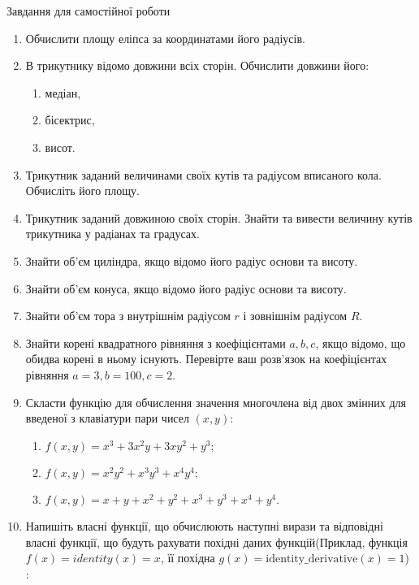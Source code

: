 \documentclass[]{article}
\makeatletter
\newcommand{\xslalph}[1]{\expandafter\@xslalph\csname c@#1\endcsname}
\newcommand{\@xslalph}[1]{%
    \ifcase#1\or а\or б\or в\or г\or д\or e\or є\or ж\or з\or i%
    \or й\or к\or л\or м\or н\or о\or п\or р\or с\or т%
    \or у\or ф\or х\or ц\or ч\or ш\or ю\or я\or аа\or бб\or вв %
    \else\@ctrerr\fi%
}
\makeatother
\begin{document}
Завдання для самостійної роботи

\begin{enumerate}
\def\labelenumi{\arabic{enumi})}
\setcounter{enumi}{7}
\item
  Обчислити площу еліпса за координатами його радіусів.
\item
  В трикутнику відомо довжини всіх сторін. Обчислити довжини його:
  \begin{enumerate}[label=\xslalph*)]
   \item
    медіан,
   \item
    бісектрис,
    \item
    висот.
  \end{enumerate}
\item
  Трикутник заданий величинами своїх кутів та радіусом вписаного кола.
  Обчисліть його площу.
\item
  Трикутник заданий довжиною своїх сторін. Знайти та вивести величину
  кутів трикутника у радіанах та градусах.
\item
  Знайти об'єм циліндра, якщо відомо його радіус основи та висоту.
\item
  Знайти об'єм конуса, якщо відомо його радіус основи та висоту.
\item
  Знайти об'єм тора з внутрішнім радіусом \(r\) і зовнішнім радіусом
  \(R\).
\item
  Знайти корені квадратного рівняння з коефіцієнтами \(a,b,c\), якщо відомо,
  що обидва корені в ньому існують. Перевірте ваш розв'язок на
  коефіцієнтах рівняння \(a=3,b=100,c=2\).
\item
  Скласти функцію для обчислення значення многочлена від двох змінних
  для введеної з клавіатури пари чисел \((x,y)\):
  \begin{enumerate}[label=\xslalph*)]
    \item
    \(f(x,y) = x^{3} + 3x^{2}y + 3xy^{2} + y^{3};\)
    \item
    \(f(x,y) = x^{2}y^{2} + x^{3}y^{3} + x^{4}y^{4};\)
    \item
    \(f(x,y) = x + y + x^{2} + y^{2} + x^{3} + y^{3} + x^{4} + y^{4}\).
  \end{enumerate}

\item
  Напишіть власні функції, що обчислюють наступні вирази та відповідні
  власні функції, що будуть рахувати похідні даних функцій(Приклад,
  функція \(f(x) = identity(x) = x\), її похідна
  \(g(x) = \textrm{identity\_derivative}(x) = 1\)) :



\end{enumerate}
\end{document}
